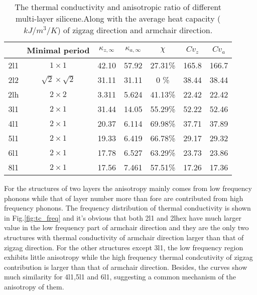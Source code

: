 \documentclass[%
 reprint,
 amsmath,amssymb,
 aps,
 prb,
]{revtex4-1}
\begin{document}
\begin{table*}
  \caption{\label{tab:table1}
    The thermal conductivity and anisotropic ratio of different multi-layer silicene.Along with the average heat capacity ($kJ/m^3/K$) of zigzag direction and armchair direction.}
  \begin{ruledtabular}
    \begin{tabular}{ccccccc}
          & Minimal period
          & $\kappa_{z,\infty}$
          & $\kappa_{a,\infty}$
          & $\chi$
          & $Cv_{z}$
          & $Cv_{a}$                                                           \\
      \hline
      2l1 & $1 \times 1$             & 42.10 & 57.92 & 27.31\% & 165.8 & 166.7 \\
      2l2 & $\sqrt{2}\times\sqrt{2}$ & 31.11 & 31.11 & 0    \% & 38.44 & 38.44 \\
      2lh & $2 \times 2$             & 3.311 & 5.624 & 41.13\% & 22.42 & 22.42 \\
      3l1 & $2 \times 1$             & 31.44 & 14.05 & 55.29\% & 52.22 & 52.46 \\
      4l1 & $2 \times 1$             & 20.37 & 6.114 & 69.98\% & 37.71 & 37.89 \\
      5l1 & $2 \times 1$             & 19.33 & 6.419 & 66.78\% & 29.17 & 29.32 \\
      6l1 & $2 \times 1$             & 17.78 & 6.527 & 63.29\% & 23.73 & 23.86 \\
      8l1 & $2 \times 1$             & 17.56 & 7.461 & 57.51\% & 17.26 & 17.36 \\
    \end{tabular}
  \end{ruledtabular}
\end{table*}

For the structures of two layers the anisotropy mainly comes from low frequency phonons while that of layer number more than fore are contributed from high frequency phonons. The frequency distribution of thermal conductivity is shown in Fig.\ref{fig:tc_freq} and it's obvious that both 2l1 and 2lhex have much larger value in the low frequency part of armchair direction and they are the only two structures with thermal conductivity of armchair direction larger than that of zigzag direction. For the other structures except 3l1, the low frequency region exhibits little anisotropy while the high frequency thermal condcutivity of zigzag contribution is larger than that of armchair direction. Besides, the curves show much similarity for 4l1,5l1 and 6l1, suggesting a common mechanism of the anisotropy of them.
\end{document}
